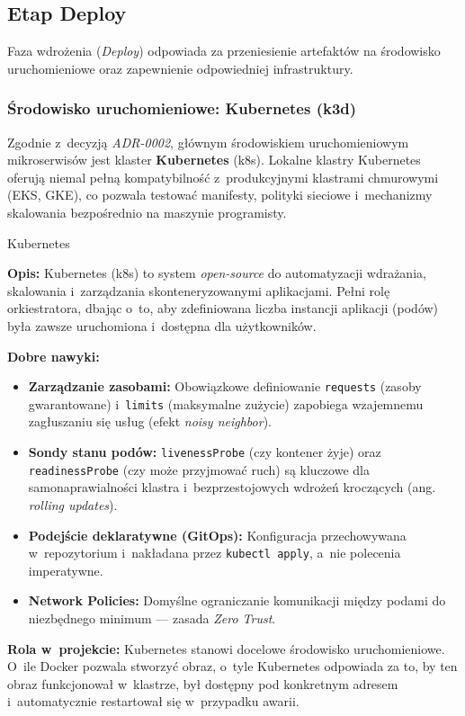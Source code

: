 \subsection{Etap Deploy}
Faza wdrożenia (\textit{Deploy}) odpowiada za przeniesienie artefaktów na środowisko uruchomieniowe oraz zapewnienie odpowiedniej infrastruktury.

\subsubsection{Środowisko uruchomieniowe: Kubernetes (k3d)}
Zgodnie z~decyzją \textit{ADR-0002}, głównym środowiskiem uruchomieniowym mikroserwisów jest klaster \textbf{Kubernetes} (k8s). Lokalne klastry Kubernetes oferują niemal pełną kompatybilność z~produkcyjnymi klastrami chmurowymi (EKS, GKE), co pozwala testować manifesty, polityki sieciowe i~mechanizmy skalowania bezpośrednio na maszynie programisty.

\begin{techcard}{Kubernetes}

\textbf{Opis:} Kubernetes (k8s) to system \textit{open-source} do automatyzacji wdrażania, skalowania i~zarządzania skonteneryzowanymi aplikacjami. Pełni rolę orkiestratora, dbając o~to, aby zdefiniowana liczba instancji aplikacji (podów) była zawsze uruchomiona i~dostępna dla użytkowników.

\textbf{Dobre nawyki:}
\begin{itemize}
  \item \textbf{Zarządzanie zasobami:} Obowiązkowe definiowanie \texttt{requests} (zasoby gwarantowane) i~\texttt{limits} (maksymalne zużycie) zapobiega wzajemnemu zagłuszaniu się usług (efekt \textit{noisy neighbor}).
  \item \textbf{Sondy stanu podów:} \texttt{livenessProbe} (czy kontener żyje) oraz \texttt{readinessProbe} (czy może przyjmować ruch) są kluczowe dla samonaprawialności klastra i~bezprzestojowych wdrożeń kroczących (ang. \textit{rolling updates}).
  \item \textbf{Podejście deklaratywne (GitOps):} Konfiguracja przechowywana w~repozytorium i~nakładana przez \texttt{kubectl apply}, a~nie polecenia imperatywne.
  \item \textbf{Network Policies:} Domyślne ograniczanie komunikacji między podami do niezbędnego minimum --- zasada \textit{Zero Trust}.
\end{itemize}

\textbf{Rola w~projekcie:} Kubernetes stanowi docelowe środowisko uruchomieniowe. O~ile Docker pozwala stworzyć obraz, o~tyle Kubernetes odpowiada za to, by ten obraz funkcjonował w~klastrze, był dostępny pod konkretnym adresem i~automatycznie restartował się w~przypadku awarii.

\end{techcard}

